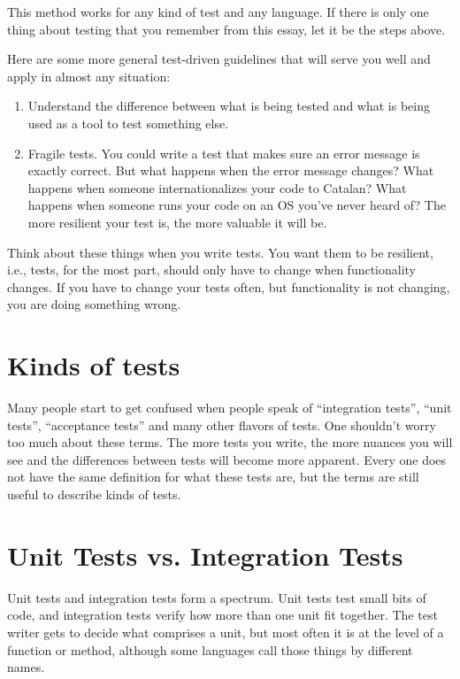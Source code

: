 This method works for any kind of test and any language. If there is only one thing about testing that you remember from this essay, let it be the steps above.

Here are some more general test-driven guidelines that will serve you well and apply in almost any situation:
\begin{enumerate}
 \item Understand the difference between what is being tested and what is being used as a tool to test something else.
 \item Fragile tests. You could write a test that makes sure an error message is exactly correct. But what happens when the error message changes? What happens when someone internationalizes your code to Catalan? What happens when someone runs your code on an OS you've never heard of? The more resilient your test is, the more valuable it will be.
\end{enumerate}

Think about these things when you write tests. You want them to be resilient, i.e., tests, for the most part, should only have to change when functionality changes. If you have to change your tests often, but functionality is not changing, you are doing something wrong.

\section*{Kinds of tests}

Many people start to get confused when people speak of ``integration tests'', ``unit tests'', ``acceptance tests'' and many other flavors of tests. One shouldn't worry too much about these terms. The more tests you write, the more nuances you will see and the differences between tests will become more apparent. Every one does not have the same definition for what these tests are, but the terms are still useful to describe kinds of tests.

\section*{Unit Tests vs. Integration Tests}

Unit tests and integration tests form a spectrum. Unit tests test small bits of code, and integration tests verify how more than one unit fit together. The test writer gets to decide what comprises a unit, but most often it is at the level of a function or method, although some languages call those things by different names.

